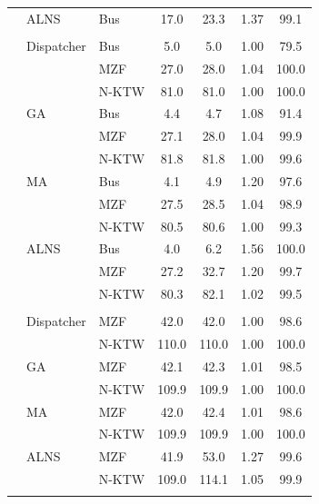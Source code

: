 \begin{table}[h]
\begin{tabular}{lllcccc}
 & ALNS & Bus & 17.0 & 23.3 & 1.37 & 99.1 \\
\addlinespace
\multicolumn{7}{l}{\textit{Flood - Augmented}} \\
 & Dispatcher & Bus & 5.0 & 5.0 & 1.00 & 79.5 \\
 &  & MZF & 27.0 & 28.0 & 1.04 & 100.0 \\
 &  & N-KTW & 81.0 & 81.0 & 1.00 & 100.0 \\
 & GA & Bus & 4.4 & 4.7 & 1.08 & 91.4 \\
 &  & MZF & 27.1 & 28.0 & 1.04 & 99.9 \\
 &  & N-KTW & 81.8 & 81.8 & 1.00 & 99.6 \\
 & MA & Bus & 4.1 & 4.9 & 1.20 & 97.6 \\
 &  & MZF & 27.5 & 28.5 & 1.04 & 98.9 \\
 &  & N-KTW & 80.5 & 80.6 & 1.00 & 99.3 \\
 & ALNS & Bus & 4.0 & 6.2 & 1.56 & 100.0 \\
 &  & MZF & 27.2 & 32.7 & 1.20 & 99.7 \\
 &  & N-KTW & 80.3 & 82.1 & 1.02 & 99.5 \\
\addlinespace
\multicolumn{7}{l}{\textit{Flood - Specialized}} \\
 & Dispatcher & MZF & 42.0 & 42.0 & 1.00 & 98.6 \\
 &  & N-KTW & 110.0 & 110.0 & 1.00 & 100.0 \\
 & GA & MZF & 42.1 & 42.3 & 1.01 & 98.5 \\
 &  & N-KTW & 109.9 & 109.9 & 1.00 & 100.0 \\
 & MA & MZF & 42.0 & 42.4 & 1.01 & 98.6 \\
 &  & N-KTW & 109.9 & 109.9 & 1.00 & 100.0 \\
 & ALNS & MZF & 41.9 & 53.0 & 1.27 & 99.6 \\
 &  & N-KTW & 109.0 & 114.1 & 1.05 & 99.9 \\
\addlinespace
\bottomrule
\end{tabular}
\end{table}